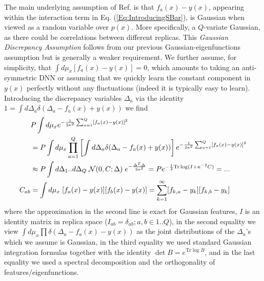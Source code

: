 The main underlying assumption of Ref. \cite{Canatar2021} is that $f_a(x)-y(x)$, appearing within the interaction term in Eq. (\ref{Eq:IntroducingSBar}), is Gaussian when viewed as a random variable over $p(x)$. More specifically, a $Q$-variate Gaussian, as there could be correlations between different replicas. This {\it Gaussian Discrepancy Assumption} follows from our previous Gaussian-eigenfunctions assumption but is generally a weaker requirement. We further assume, for simplicity, that $\int d\mu_x [f_a(x)-y(x)]=0$, which amounts to taking an anti-symmetric DNN or assuming that we quickly learn the constant component in $y(x)$ perfectly without any fluctuations (indeed it is typically easy to learn). Introducing the discrepancy variables $\Delta_a$ via the identity $1=\int d\Delta_a  \delta(\Delta_a-f_a(x)+y(x))$ we find 
\begin{align}
\label{Eq:PoissonInteraction}
&P \int d\mu_x e^{-\frac{1}{2\kappa^2}\sum_{a=1}^Q [f_a(x)-y(x)]^2} \\ \nonumber 
&= P \int d\mu_x \prod_{a=1}^Q \left[\int d\Delta_a \delta(\Delta_a-f_a(x)+y(x))\right]e^{-\frac{1}{2\kappa^2}\sum_{a=1}^Q [f_a(x)-y(x)]^2}\\ \nonumber 
&\approx P\int d\Delta_{1}..d\Delta_Q \; {\cal N}(0,C;\Delta) \; e^{-\frac{\Delta^T \Delta}{2 \kappa^2}} 
= P e^{-\frac{1}{2} \text{Tr}\log(I+ \kappa^{-2} C)} = ...\\ \nonumber 
C_{ab} &= \int d\mu_x \; [f_a(x)-y(x)][f_b(x)-y(x)] = \sum_{k=1}^{\infty} [f_{k,a}-y_k][f_{k,b}-y_k]
\end{align}
where the approximation in the second line is exact for Gaussian features,
$I$ is an identity matrix in replica space ($I_{ab}=\delta_{ab};a,b\in 1..Q$), in the second equality we view $\int d\mu_x \prod \delta(\Delta_a - f_a(x)-y(x))$ as the joint distributions of the $\Delta_a$'s which we assume is Gaussian, in the third equality we used standard Gaussian integration formulas together with the identity $\det B = e^{\text{Tr} \log B}$, and in the last equality we used a spectral decomposition and the orthogonality of features/eigenfunctions. 

